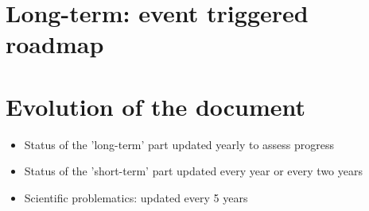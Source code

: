 \documentclass{article}
\begin{document}
\section{\label{sec:LongTerm}Long-term: event triggered roadmap}
\begin{sidewaysfigure}

\end{sidewaysfigure}

\section{Evolution of the document}

\begin{itemize}
\item Status of the 'long-term' part updated yearly to assess progress
\item Status of the 'short-term' part updated every year or every two years
\item Scientific problematics: updated every 5 years
\end{itemize}

\end{document}
